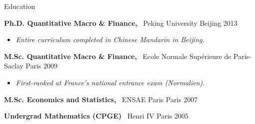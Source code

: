 \documentclass[usegeometry, 10pt, a4paper]{cv} %
\newcommand{\activite}[1]{\textbf{#1}\ }
\begin{document}
\begin{rubriquetableau}[0.95\textwidth]{Education}\\
  \vspace{-0.5cm}
  
  \activite{Ph.D. Quantitative Macro \& Finance,} Peking University \hfill Beijing 2013\\ 
  \vspace{-0.5cm}  
  \begin{itemize}[label={}, rightmargin=\dimexpr\linewidth-13cm-\leftmargin\relax]
  \item \small{\emph{Entire curriculum completed in Chinese Mandarin in Beijing.}}
  \end{itemize}
  
  \vspace{0.2cm}
  
  \activite{M.Sc. Quantitative Macro \& Finance,} Ecole Normale Supérieure de Paris-Saclay \hfill Paris 2009\\
  \vspace{-0.5cm}
  \begin{itemize}[label={}, rightmargin=\dimexpr\linewidth-13cm-\leftmargin\relax]
  \item \small{\emph{First-ranked at France's national entrance exam (Normalien).}}
  \end{itemize}

  \vspace{0.2cm}

  \activite{M.Sc. Economics and Statistics,} ENSAE Paris \hfill Paris 2007\\
  \vspace{0.2cm}

  \activite{Undergrad Mathematics (CPGE)} Henri IV \hfill Paris 2005\\
\end{rubriquetableau}

\vspace{0.5cm}
\end{document}
